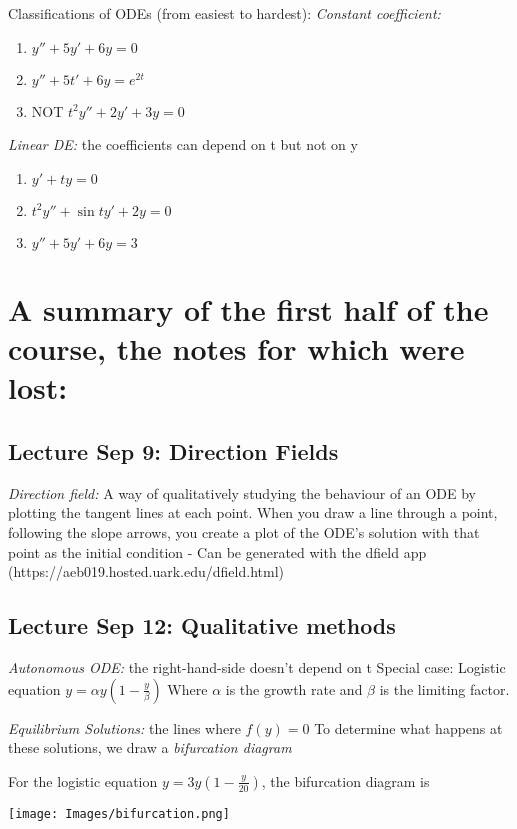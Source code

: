 \documentclass[12pt]{article}
\begin{document}
Classifications of ODEs (from easiest to hardest):
\emph{Constant coefficient:}
\begin{enumerate}
    \item $y'' + 5y' + 6y = 0$
    \item $y'' + 5t' + 6y = e^{2t}$
    \item NOT $t^2 y'' + 2y' + 3y = 0$
\end{enumerate}

\emph{Linear DE:} the coefficients can depend on t but not on y
\begin{enumerate}
    \item $y' + ty = 0$
    \item $t^2 y'' + \sin t y' + 2y = 0$
    \item $y'' + 5y' + 6y = 3$
\end{enumerate}

\section{A summary of the first half of the course, the notes for which were lost:}
\subsection*{Lecture Sep 9: Direction Fields}

\emph{Direction field:} A way of qualitatively studying the behaviour of an ODE by plotting the tangent lines at each point. When you draw a line through a point, following the slope arrows, you create a plot of the ODE's solution with that point as the initial condition
- Can be generated with the dfield app (https://aeb019.hosted.uark.edu/dfield.html)

\subsection*{Lecture Sep 12: Qualitative methods}

\emph{Autonomous ODE:} the right-hand-side doesn't depend on t
Special case: Logistic equation $y = \alpha y (1 - \frac{y}{\beta})$
Where $\alpha$ is the growth rate and $\beta$ is the limiting factor. 

\emph{Equilibrium Solutions:} the lines where $f(y) = 0$
To determine what happens at these solutions, we draw a \emph{bifurcation diagram}

For the logistic equation $y= 3y (1 - \frac{y}{20})$, the bifurcation diagram is 

\texttt{[image: Images/bifurcation.png]}
\end{document}

